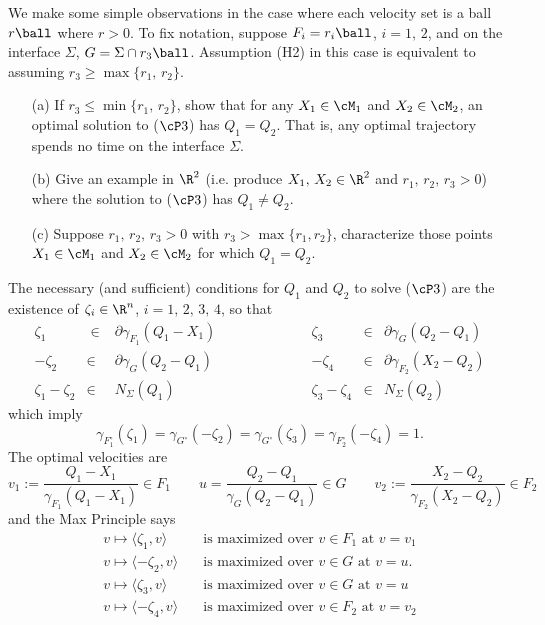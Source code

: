 \documentclass[12pt]{article}
\begin{document}
We make some simple observations in the case where each velocity set is a ball $r\ball$ where $r>0$.  To fix notation, suppose $F_i=r_i\ball$, $i=1,\,2$, and on the interface $\Sigma$, $G=\Sigma\cap r_3\ball$.  Assumption (H2) in this case is equivalent to assuming $r_3\geq\max\{r_1,\,r_2\}$.

{\blue
\begin{exer}
\begin{itemize}
\item[(a)]  If $r_3\leq\min\{r_1,\,r_2\}$, show that for
 any $X_1\in\cM_1$ and $X_2\in\cM_2$, an optimal solution to ($\cP3$) has $Q_1=Q_2$.  That is, any optimal trajectory spends no time on the interface $\Sigma$.
\item[(b)]  Give an example in $\R^2$ (i.e. produce $X_1,\,X_2\in\R^2$ and $r_1,\,r_2,\,r_3>0$) where the solution to ($\cP3$) has $Q_1\not= Q_2$.
\item[(c)]  Suppose  $r_1,\,r_2,\,r_3>0$ with $r_3>\max\{r_1,r_2\}$, characterize those points $X_1\in\cM_1$ and $X_2\in\cM_2$ for which $Q_1=Q_2$. 
\end{itemize}
\end{exer}
}

The necessary (and sufficient) conditions for $Q_1$ and $Q_2$ to solve ($\cP3$) are the existence of $\zeta_i\in\R^n$, $i=1,\,2,\,3,\,4$, so that
\[
\begin{array}{rclrcl}
\zeta_1 & \; \in \; & \partial\gamma_{F_1}(Q_1-X_1) \qquad\qquad\qquad 
&\zeta_3 & \in & \partial\gamma_{G}(Q_2-Q_1)   \\
-\zeta_2 & \in &\partial\gamma_{G}(Q_2-Q_1) 
&-\zeta_4 & \in & \partial\gamma_{F_2}(X_2-Q_2)  \\ 
\zeta_1-\zeta_2 & \in & N_{\Sigma}(Q_1) 
&\zeta_3-\zeta_4 & \in & N_{\Sigma}(Q_2)  
\end{array}
\]
which imply
\begin{equation}\label{eq: 2polar = 1}
\gamma_{F_1^{\circ}}(\zeta_1)=
\gamma_{G^{\circ}}(-\zeta_2)=
\gamma_{G^{\circ}}(\zeta_3)= 
\gamma_{F_2^{\circ}}(-\zeta_4)=1.
\end{equation}
The optimal velocities are
\[
v_1:=\frac{Q_1-X_1}{\gamma_{F_1}(Q_1-X_1)}\in F_1 \qquad 
u=\frac{Q_2-Q_1}{\gamma_{G}(Q_2-Q_1)}\in G \qquad
v_2:=\frac{X_2-Q_2}{\gamma_{F_2}(X_2-Q_2)}\in F_2
\]
and the Max Principle says
\begin{align}
v\mapsto \langle\zeta_1,v\rangle\quad &\text{is maximized over }v\in F_1\text{ at } v=v_1 \label{eq: 2MP1}\\
v\mapsto \langle-\zeta_2,v\rangle\quad &\text{is maximized over }v\in G\text{ at } v=u. \label{eq: 2MP2} \\
v\mapsto \langle\zeta_3,v\rangle\quad &\text{is maximized over }v\in G\text{ at } v=u \label{eq: 2MP3}  \\
v\mapsto \langle-\zeta_4,v\rangle\quad &\text{is maximized over }v\in F_2\text{ at } v=v_2 \label{eq: 2MP4}
\end{align}
\end{document}
